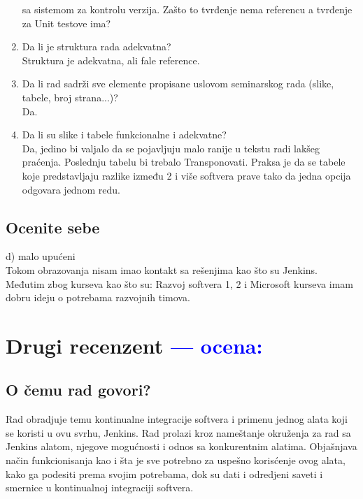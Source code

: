 \documentclass[a4paper]{report}
\newcommand{\odgovor}[1]{\textcolor{blue}{#1}}
\begin{document}
\begin{enumerate}
  sa sistemom za kontrolu verzija. Zašto to tvrđenje nema referencu a tvrđenje za Unit testove ima?
\item Da li je struktura rada adekvatna?\\
  Struktura je adekvatna, ali fale reference.
\item Da li rad sadrži sve elemente propisane uslovom seminarskog rada (slike, tabele, broj strana...)?\\
  Da.
\item Da li su slike i tabele funkcionalne i adekvatne?\\
  Da, jedino bi valjalo da se pojavljuju malo ranije u tekstu radi lakšeg praćenja.
  Poslednju tabelu bi trebalo Transponovati. Praksa je da se tabele koje predstavljaju
  razlike između 2 i više softvera prave tako da jedna opcija odgovara jednom redu.
\end{enumerate}



\section{Ocenite sebe}
d) malo upućeni \\
Tokom obrazovanja nisam imao kontakt sa rešenjima kao što su Jenkins.
Međutim zbog kurseva kao što su: Razvoj softvera 1, 2 i Microsoft kurseva imam 
dobru ideju o potrebama razvojnih timova.


\chapter{Drugi recenzent \odgovor{--- ocena:} }
\section{O čemu rad govori?}
Rad obradjuje temu kontinualne integracije softvera i primenu jednog alata koji se koristi u ovu svrhu, Jenkins. Rad prolazi kroz nameštanje okruženja za rad sa Jenkins alatom, njegove mogućnosti i odnos sa konkurentnim alatima. Objašnjava način funkcionisanja kao i šta je sve potrebno za uspešno korisćenje ovog alata, kako ga podesiti prema svojim potrebama, dok su dati i odredjeni saveti i smernice u kontinualnoj integraciji softvera.
\end{document}
